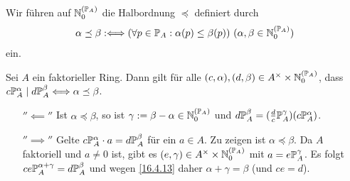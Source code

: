 \documentclass[../../main.tex]{subfiles}
\begin{document}
\begin{nt}\label{16.4.16}
Wir führen auf $\N_0^{(\P_A)}$ die Halbordnung $\preceq$ definiert durch
\begin{align*}
\alpha\preceq\beta:\Longleftrightarrow(\forall p\in \P_A: \alpha(p)\le \beta(p))\ (\alpha,\beta\in \N_0^{(\P_A)})
\end{align*}
ein.
\end{nt}

\begin{pro}\label{16.4.17}
Sei $A$ ein faktorieller Ring. Dann gilt für alle $(c,\alpha),(d,\beta)\in A^\times\times \N_0^{(\P_A)}$, dass $c\P_A^\alpha\mid d\P_A^\beta\Longleftrightarrow \alpha\preceq\beta$.
\end{pro}
\begin{cproof}
\begin{itemize}
\item[$''\impliedby''$] Ist $\alpha\preceq \beta$, so ist  $\gamma:=\beta-\alpha\in \N_0^{(\P_A)}$ und $d\P_A^\beta=(\frac{d}{c}\P_A^\gamma)(c\P_A^\alpha)$.
\item[$''\implies''$] Gelte $c\P_A^\alpha\cdot a=d\P_A^\beta$ für ein $a\in A$. Zu zeigen ist $\alpha\preceq \beta$. Da $A$ faktoriell und $a\neq 0$ ist, gibt es $(e,\gamma)\in A^\times\times \N_0^{(\P_A)}$ mit $a=e\P_A^\gamma$. Es folgt $ce\P_A^{\alpha+\gamma}=d\P_A^\beta$ und wegen \ref{16.4.13} daher $\alpha+\gamma=\beta$ (und $ce=d$).
\end{itemize}
\end{cproof}
\end{document}
